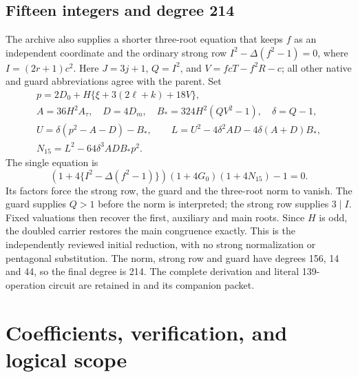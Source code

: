 \documentclass[11pt]{article}
\theoremstyle{remark}\newtheorem{remark}[theorem]{Remark}
\newcommand{\file}[1]{\path{#1}}
\begin{document}
\subsection{Fifteen integers and degree 214}
The archive also supplies a shorter three-root equation that keeps $f$ as
an independent coordinate and the ordinary strong row
$I^2-\Delta(f^2-1)=0$, where $I=(2r+1)c^2$.
Here $J=3j+1$, $Q=I^2$, and $V=fcT-f^2R-c$; all other native and
guard abbreviations agree with the parent. Set
\begin{gather*}
 p=2D_0+H\{\xi+3(2\ell+k)+18V\},\\
 A=36H^2A_\tau,\quad D=4D_m,\quad B_*=324H^2(QV^2-1),\quad\delta=Q-1,\\
 U=\delta(p^2-A-D)-B_*,\qquad
 L=U^2-4\delta^2AD-4\delta(A+D)B_*,\\
 N_{15}=L^2-64\delta^3ADB_*p^2.
\end{gather*}
The single equation is
\[
 (1+4\{I^2-\Delta(f^2-1)\})(1+4G_0)(1+4N_{15})-1=0.
\]
Its factors force the strong row, the guard and the three-root norm to
vanish. The guard supplies $Q>1$ before the norm is interpreted; the
strong row supplies $3\mid I$. Fixed valuations then recover the first,
auxiliary and main roots. Since $H$ is odd, the doubled carrier restores
the main congruence exactly. This is the independently reviewed initial
reduction, with no strong normalization or pentagonal substitution.
The norm, strong row and guard have degrees 156, 14 and 44, so the final
degree is 214. The complete derivation and literal 139-operation circuit
are retained in \file{forms/COMPACT15_PROOF.md} and its companion packet.

\section{Coefficients, verification, and logical scope}\label{sec:scope}
\end{document}
